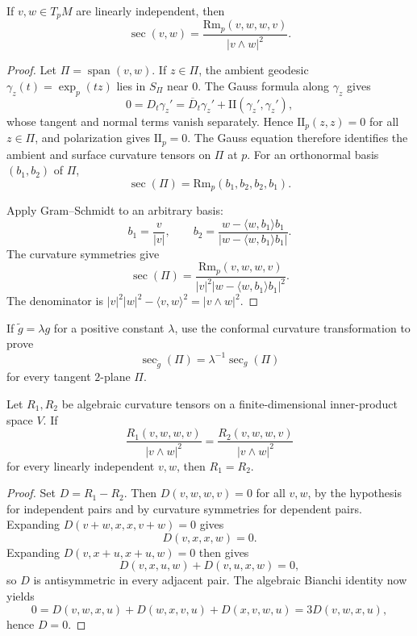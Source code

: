 \begin{proposition}
\label{prop:sectional-curvature-formula}
If $v,w\in T_pM$ are linearly independent, then
\[
\sec(v,w)=\frac{\mathrm{Rm}_p(v,w,w,v)}{|v\wedge w|^2}.
\]
\end{proposition}

\begin{proof}
\sketch
Let $\Pi=\operatorname{span}(v,w)$.  If $z\in\Pi$, the ambient geodesic
$\gamma_z(t)=\exp_p(tz)$ lies in $S_\Pi$ near $0$.  The Gauss formula along
$\gamma_z$ gives
\[
0=D_t\gamma_z'=\overline D_t\gamma_z'+\mathrm{II}(\gamma_z',\gamma_z'),
\]
whose tangent and normal terms vanish separately.  Hence
$\mathrm{II}_p(z,z)=0$ for all $z\in\Pi$, and polarization gives
$\mathrm{II}_p=0$.  The Gauss equation therefore identifies the ambient and
surface curvature tensors on $\Pi$ at $p$.  For an orthonormal basis
$(b_1,b_2)$ of $\Pi$,
\[
\sec(\Pi)=\mathrm{Rm}_p(b_1,b_2,b_2,b_1).
\]

Apply Gram--Schmidt to an arbitrary basis:
\[
b_1=\frac v{|v|},
\qquad
b_2=\frac{w-\langle w,b_1\rangle b_1}
{|w-\langle w,b_1\rangle b_1|}.
\]
The curvature symmetries give
\begin{equation}
\sec(\Pi)=
\frac{\mathrm{Rm}_p(v,w,w,v)}
{|v|^2|w-\langle w,b_1\rangle b_1|^2}. \tag{8.29}
\end{equation}
The denominator is
$|v|^2|w|^2-\langle v,w\rangle^2=|v\wedge w|^2$.
\end{proof}

\begin{exercise}
\label{exer:metric-scaling-sectional-curvature}
If $\widetilde g=\lambda g$ for a positive constant $\lambda$, use the
conformal curvature transformation to prove
\[
\sec_{\widetilde g}(\Pi)=\lambda^{-1}\sec_g(\Pi)
\]
for every tangent $2$-plane $\Pi$.
\end{exercise}

\begin{proposition}
\label{prop:sectional-curvature-determines-curvature-tensor}
Let $R_1,R_2$ be algebraic curvature tensors on a finite-dimensional
inner-product space $V$.  If
\[
\frac{R_1(v,w,w,v)}{|v\wedge w|^2}
=\frac{R_2(v,w,w,v)}{|v\wedge w|^2}
\]
for every linearly independent $v,w$, then $R_1=R_2$.
\end{proposition}

\begin{proof}
\sketch
Set $D=R_1-R_2$.  Then $D(v,w,w,v)=0$ for all $v,w$, by the hypothesis for
independent pairs and by curvature symmetries for dependent pairs.  Expanding
$D(v+w,x,x,v+w)=0$ gives
\[
D(v,x,x,w)=0.
\]
Expanding $D(v,x+u,x+u,w)=0$ then gives
\[
D(v,x,u,w)+D(v,u,x,w)=0,
\]
so $D$ is antisymmetric in every adjacent pair.  The algebraic Bianchi
identity now yields
\[
0=D(v,w,x,u)+D(w,x,v,u)+D(x,v,w,u)=3D(v,w,x,u),
\]
hence $D=0$.
\end{proof}

